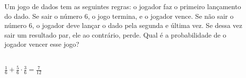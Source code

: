 \begin{ex}
Um jogo de dados tem as seguintes regras: o jogador faz o primeiro lançamento do dado.  Se sair o número 6, o jogo termina, e o jogador vence. Se não sair o número 6, o jogador deve lançar o dado pela segunda e última vez. Se dessa vez sair um resultado par, ele ao contrário, perde. Qual é a probabilidade de o jogador vencer esse jogo?
  \begin{sol}
   \phantom{A} \\
   $\frac{1}{6}+\frac{5}{6}\cdot\frac{3}{6}=\frac{7}{12}$
  \end{sol}
\end{ex}